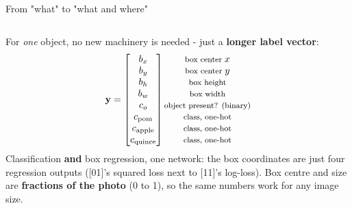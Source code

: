 \documentclass[aspectratio=169]{beamer}
\begin{document}
\begin{frame}{From "what" to "what and where"}
  \begin{columns}[T]
    For \emph{one} object, no new machinery is needed - just a \textbf{longer label
    vector}:
    \[
      \mathbf{y} =
      \begin{bmatrix}
        b_x\\ b_y\\ b_h\\ b_w\\ c_o\\ c_{\text{pom}}\\ c_{\text{apple}}\\ c_{\text{quince}}
      \end{bmatrix}
      \begin{matrix}
        \text{\footnotesize box center }x\\
        \text{\footnotesize box center }y\\
        \text{\footnotesize box height}\\
        \text{\footnotesize box width}\\
        \text{\footnotesize object present? (binary)}\\
        \text{\footnotesize class, one-hot}\\
        \text{\footnotesize class, one-hot}\\
        \text{\footnotesize class, one-hot}
      \end{matrix}
    \]
    Classification \textbf{and} box regression, one network: the box coordinates are
    just four regression outputs ([01]'s squared loss next to [11]'s log-loss).
    \vskip 6pt
    Box centre and size are \textbf{fractions of the photo} (0 to 1), so the same numbers
    work for any image size.
    \vskip 6pt
  \end{columns}
\end{frame}
\end{document}
